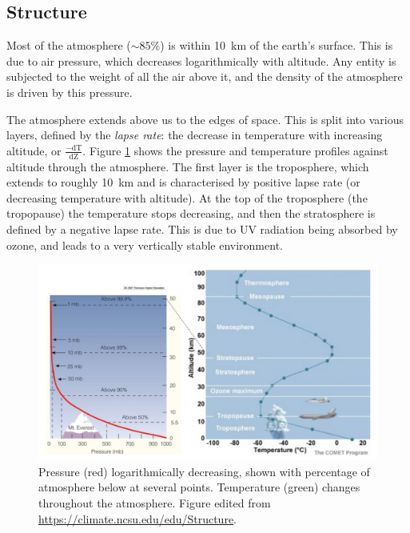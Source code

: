   
  \subsection{Structure}
  \label{LR:Atmos:Struct}
    
    Most of the atmosphere ($\sim 85\%$) is within 10~km of the earth's surface.
    This is due to air pressure, which decreases logarithmically with altitude.
    Any entity is subjected to the weight of all the air above it, and the density of the atmosphere is driven by this pressure.
    
    The atmosphere extends above us to the edges of space. 
    This is split into various layers, defined by the \textit{lapse rate}: the decrease in temperature with increasing altitude, or $\frac{-\textrm{dT}}{\textrm{dZ}}$.
    Figure \ref{LR:Atmos:Struct:Fig_atmos_layers} shows the pressure and temperature profiles against altitude through the atmosphere.
    The first layer is the troposphere, which extends to roughly 10~km and is characterised by positive lapse rate (or decreasing temperature with altitude).
    At the top of the troposphere (the tropopause) the temperature stops decreasing, and then the stratosphere is defined by a negative lapse rate.
    This is due to UV radiation being absorbed by ozone, and leads to a very vertically stable environment.
    
    \begin{figure}
      \includegraphics[width=\textwidth]{Figures/Atmos_Temp_Press.jpg}
      \caption{%
        Pressure (red) logarithmically decreasing, shown with percentage of atmosphere below at several points.
        Temperature (green) changes throughout the atmosphere.
        Figure edited from \url{https://climate.ncsu.edu/edu/Structure}.
      }
      \label{LR:Atmos:Struct:Fig_atmos_layers}
    \end{figure}
    
